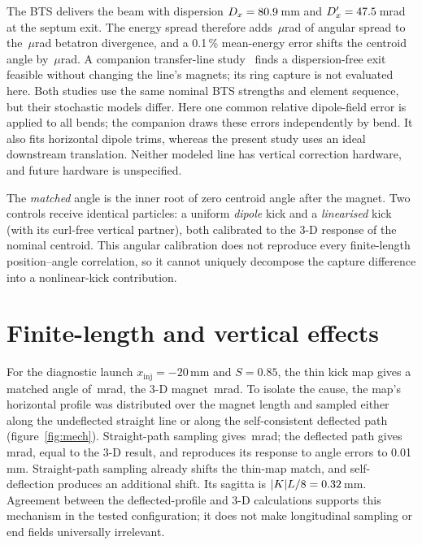 \documentclass[aps,prab,reprint,amsmath,amssymb,floatfix,longbibliography]{revtex4-2}
\begin{document}
The BTS delivers the beam with dispersion $D_x=80.9$\,mm and $D'_x=47.5$\,mrad at the septum exit. The energy spread therefore adds \SeptDispDivUrad\,$\mu$rad of angular spread to the \SeptBetaDivUrad\,$\mu$rad betatron divergence, and a 0.1\,\% mean-energy error shifts the centroid angle by \SeptShotAngleUrad\,$\mu$rad. A companion transfer-line study~\cite{ParkBTS2026} finds a dispersion-free exit feasible without changing the line's magnets; its ring capture is not evaluated here. Both studies use the same nominal BTS strengths and element sequence, but their stochastic models differ. Here one common relative dipole-field error is applied to all bends; the companion draws these errors independently by bend. It also fits horizontal dipole trims, whereas the present study uses an ideal downstream translation. Neither modeled line has vertical correction hardware, and future hardware is unspecified.

The \emph{matched} angle is the inner root of zero centroid angle after the magnet. Two controls receive identical particles: a uniform \emph{dipole} kick and a \emph{linearised} kick (with its curl-free vertical partner), both calibrated to the 3-D response of the nominal centroid. This angular calibration does not reproduce every finite-length position--angle correlation, so it cannot uniquely decompose the capture difference into a nonlinear-kick contribution.

\section{Finite-length and vertical effects}
\label{sec:mechanism}

For the diagnostic launch $x_\mathrm{inj}=-20$\,mm and $S=0.85$, the thin kick map gives a matched angle of \MatchThinMrad\,mrad, the 3-D magnet \MatchThreeDMrad\,mrad. To isolate the cause, the map's horizontal profile was distributed over the magnet length and sampled either along the undeflected straight line or along the self-consistent deflected path (figure~\ref{fig:mech}). Straight-path sampling gives \MatchStraightMrad\,mrad; the deflected path gives \MatchBentMrad\,mrad, equal to the 3-D result, and reproduces its response to angle errors to 0.01\,mm. Straight-path sampling already shifts the thin-map match, and self-deflection produces an additional shift. Its sagitta is $|K|L/8=0.32$\,mm. Agreement between the deflected-profile and 3-D calculations supports this mechanism in the tested configuration; it does not make longitudinal sampling or end fields universally irrelevant.
\end{document}
